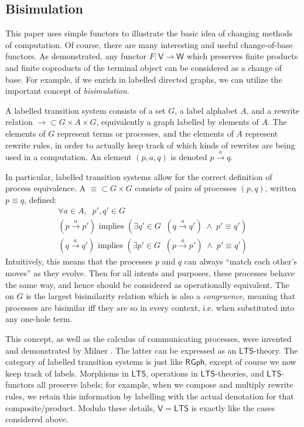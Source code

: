 \documentclass{amsart}
\newcommand{\define}[1]{{\bf \boldmath{#1}}}
\theoremstyle{definition}
\newcommand{\RGph}{\mathsf{RGph}}
\newcommand{\V}{\mathsf{V}}
\newcommand{\W}{\mathsf{W}}
\newcommand{\LTS}{\mathsf{LTS}}
\newcommand{\maps}{\colon}
\begin{document}
\subsection{Bisimulation}
\label{ssec:bisimulation}

This paper uses simple functors to illustrate the basic idea of changing methods of computation. Of course, there are many interesting and useful change-of-base functors. As demonstrated, any functor $F\maps \V\to \W$ which preserves finite products and finite coproducts of the terminal object can be considered as a change of base. For example, if we enrich in labelled directed graphs, we can utilize the important concept of \textit{bisimulation}.

A labelled transition system consists of a set $G$, a label alphabet $A$, and a rewrite relation $\rightarrow \subset G\times A\times G$, equivalently a graph labelled by elements of $A$. The elements of $G$ represent terms or processes, and the elements of $A$ represent rewrite rules, in order to actually keep track of which kinds of rewrites are being used in a computation. An element $(p,a,q)$ is denoted $p\xrightarrow{a} q$.

In particular, labelled transition systems allow for the correct definition of process equivalence. A \define{bisimilarity relation} $\equiv \subset G\times G$ consists of pairs of processes $(p,q)$, written $p\equiv q$, defined:
\[\begin{array}{ll}
    \forall a\in A, \;\; p',q'\in G\\
    (p\xrightarrow{a}p')\text{ implies } (\exists q'\in G \;\; (q\xrightarrow{a}q') \; \wedge \; p'\equiv q')\\
    (q\xrightarrow{a}q')\text{ implies } (\exists p'\in G \;\; (p\xrightarrow{a}p') \; \wedge \; p'\equiv q')
    \end{array}\]
  Intuitively, this means that the processes $p$ and $q$ can always ``match each other's moves'' as they evolve. Then for all intents and purposes, these processes behave the same way, and hence should be considered as operationally equivalent. The \define{bisimulation} on $G$ is the largest bisimilarity relation which is also a \textit{congruence}, meaning that processes are bisimilar iff they are so in every context, i.e. when substituted into any one-hole term.
  
 This concept, as well as the calculus of communicating processes, were invented and demonstrated by Milner \cite{ccs}. The latter can be expressed as an $\LTS$-theory. The category of labelled transition systems is just like $\RGph$, except of course we now keep track of labels. Morphisms in $\LTS$, operations in $\LTS$-theories, and $\LTS$-functors all preserve labels; for example, when we compose and multiply rewrite rules, we retain this information by labelling with the actual denotation for that composite/product. Modulo these details, $\V=\LTS$ is exactly like the cases considered above.
\end{document}
